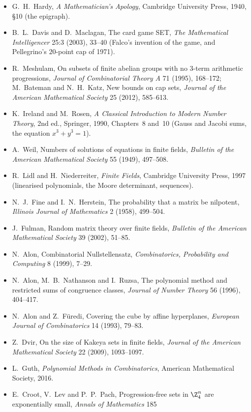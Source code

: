 \begin{itemize}
\item G.~H.~Hardy, \emph{A Mathematician's Apology}, Cambridge University Press, 1940, \S10 (the epigraph).
\item B.~L.~Davis and D.~Maclagan, The card game SET, \emph{The Mathematical Intelligencer} 25:3 (2003), 33--40 (Falco's
invention of the game, and Pellegrino's $20$-point cap of 1971).
\item R.~Meshulam, On subsets of finite abelian groups with no 3-term arithmetic progressions, \emph{Journal of Combinatorial
Theory A} 71 (1995), 168--172; M.~Bateman and N.~H.~Katz, New bounds on cap sets, \emph{Journal of the American Mathematical
Society} 25 (2012), 585--613.
\item K.~Ireland and M.~Rosen, \emph{A Classical Introduction to Modern Number Theory}, 2nd ed., Springer, 1990, Chapters~8 and~10
(Gauss and Jacobi sums, the equation $x^3+y^3=1$).
\item A.~Weil, Numbers of solutions of equations in finite fields, \emph{Bulletin of the American Mathematical Society} 55 (1949),
497--508.
\item R.~Lidl and H.~Niederreiter, \emph{Finite Fields}, Cambridge University Press, 1997 (linearised polynomials, the Moore
determinant, sequences).
\item N.~J.~Fine and I.~N.~Herstein, The probability that a matrix be nilpotent, \emph{Illinois Journal of Mathematics} 2 (1958),
499--504.
\item J.~Fulman, Random matrix theory over finite fields, \emph{Bulletin of the American Mathematical Society} 39 (2002), 51--85.
\item N.~Alon, Combinatorial Nullstellensatz, \emph{Combinatorics, Probability and Computing} 8 (1999), 7--29.
\item N.~Alon, M.~B.~Nathanson and I.~Ruzsa, The polynomial method and restricted sums of congruence classes, \emph{Journal of Number
Theory} 56 (1996), 404--417.
\item N.~Alon and Z.~Füredi, Covering the cube by affine hyperplanes, \emph{European Journal of Combinatorics} 14 (1993), 79--83.
\item Z.~Dvir, On the size of Kakeya sets in finite fields, \emph{Journal of the American Mathematical Society} 22 (2009), 1093--1097.
\item L.~Guth, \emph{Polynomial Methods in Combinatorics}, American Mathematical Society, 2016.
\item E.~Croot, V.~Lev and P.~P.~Pach, Progression-free sets in $\Z_4^n$ are exponentially small, \emph{Annals of Mathematics} 185

\end{itemize}
